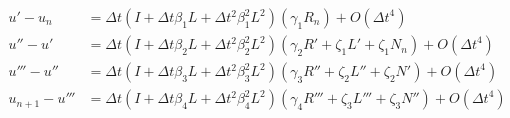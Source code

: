 \documentclass[letterpaper,11pt]{amsart}
\newcommand{\order}[2]{\ensuremath{O\!\left( {#1}^{#2} \right)}}
\begin{document}
\begin{subequations}
\begin{align}
  u' - u_{n}
  &=
  \Delta{}t
  \left(
      I
    + \Delta{}t \beta_{1} L
    + \Delta{}t^{2} \beta_{1}^{2} L^{2}
  \right)
  \left(
    \gamma_{1} R_{n}
  \right)
  + \order{\Delta{}t}{4}
\\
  u'' - u'
  &=
  \Delta{}t
  \left(
      I
    + \Delta{}t \beta_{2} L
    + \Delta{}t^{2} \beta_{2}^{2} L^{2}
  \right)
  \left(
      \gamma_{2} R'
    + \zeta_{1}  L'
    + \zeta_{1}  N_{n}
  \right)
  + \order{\Delta{}t}{4}
\\
  u''' - u''
  &=
  \Delta{}t
  \left(
      I
    + \Delta{}t \beta_{3} L
    + \Delta{}t^{2} \beta_{3}^{2} L^{2}
  \right)
  \left(
      \gamma_{3} R''
    + \zeta_{2}  L''
    + \zeta_{2}  N'
  \right)
  + \order{\Delta{}t}{4}
\\
  u_{n+1} - u'''
  &=
  \Delta{}t
  \left(
      I
    + \Delta{}t \beta_{4} L
    + \Delta{}t^{2} \beta_{4}^{2} L^{2}
  \right)
  \left(
      \gamma_{4} R'''
    + \zeta_{3}  L'''
    + \zeta_{3}  N''
  \right)
  + \order{\Delta{}t}{4}
\end{align}
\end{subequations}
\end{document}
